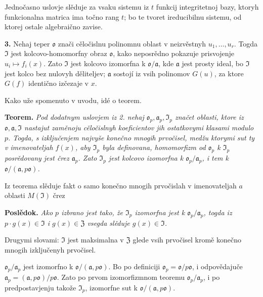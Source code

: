 \documentclass[11pt]{article}
\begin{document}
Jednočasno uslovje slěduje za vsaku sistemu iz \(t\) funkcij integritetnoj bazy, ktoryh funkcionalna matrica ima točno rang \(t\); bo te tvoret ireducibilnu sistemu, od ktorej ostale algebraično zavise.

\medskip\noindent\textbf{3.}
Nehaj teper \(\mathfrak{o}\) znači cěločislnu polinomnu oblast v neizvěstnyh \(u_1,\ldots,u_r\). Togda \(\mathfrak{I}\) jest kolcovo-homomorfny obraz \(\mathfrak{o}\), kako neposrědno pokazuje prisvojenje \(u_i\mapsto f_i(x)\). Zato \(\mathfrak{I}\) jest kolcovo izomorfna k \(\mathfrak{o}/\mathfrak{a}\), kde \(\mathfrak{a}\) jest prosty ideal, bo \(\mathfrak{I}\) jest kolco bez nulovyh děliteljev; \(\mathfrak{a}\) sostojí iz vsih polinomov \(G(u)\), za ktore \(G(f)\) identično izčezaje v \(x\).

Kako uže spomenuto v uvodu, idé o teorem.

\medskip\noindent\textbf{Teorem.}
\textit{Pod dodatnym uslovjem iz 2. nehaj \(\mathfrak{o}_p,\mathfrak{a}_p,\mathfrak{I}_p\) značet oblasti, ktore iz \(\mathfrak{o},\mathfrak{a},\mathfrak{I}\) nastajut zaměnoju cěločislnyh koeficientov jih ostatkovymi klasami modulo \(p\). Togda, s izključenjem najvyše konečno mnogih prvočisel, medžu ktorymi sut ty v imenovateljah \(f(x)\), aby \(\mathfrak{I}_p\) byla definovana, homomorfizm od \(\mathfrak{o}_p\) k \(\mathfrak{I}_p\) posrědovany jest črez \(\mathfrak{a}_p\). Zato \(\mathfrak{I}_p\) jest kolcovo izomorfna k \(\mathfrak{o}_p/\mathfrak{a}_p\), i tem k \(\mathfrak{o}/(\mathfrak{a},p\mathfrak{o})\).}

Iz teorema slěduje fakt o samo konečno mnogih prvočislah v imenovateljah \(a\) oblasti \(M(\mathfrak{I})\) črez

\medskip\noindent\textbf{Poslědok.}
\textit{Ako \(p\) izbrano jest tako, že \(\mathfrak{I}_p\) izomorfna jest k \(\mathfrak{o}_p/\mathfrak{a}_p\), togda iz \(p\cdot g(x)\in\mathfrak{I}\) i \(g(x)\in\mathfrak{Z}\) vsegda slěduje \(g(x)\in\mathfrak{I}\).}

Drugymi slovami: \(\mathfrak{I}\) jest maksimalna v \(\mathfrak{Z}\) glede vsih prvočisel kromě konečno mnogih izključenyh prvočisel.

\(\mathfrak{o}_p/\mathfrak{a}_p\) jest izomorfno k \(\mathfrak{o}/(\mathfrak{a},p\mathfrak{o})\). Bo po definiciji \(\mathfrak{o}_p=\mathfrak{o}/p\mathfrak{o}\), i odpovědajuče \(\mathfrak{a}_p=(\mathfrak{a},p\mathfrak{o})/p\mathfrak{o}\). Zato po prvom izomorfizmnom teoremu \(\mathfrak{o}_p/\mathfrak{a}_p\), i po predpostavjenju takože \(\mathfrak{I}_p\), izomorfne sut k \(\mathfrak{o}/(\mathfrak{a},p\mathfrak{o})\).
\end{document}
